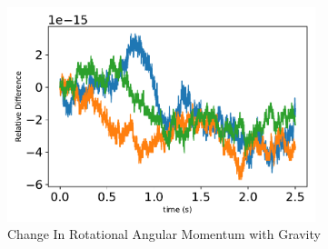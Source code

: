 \begin{figure}[htbp]\centerline{\includegraphics[width=0.8\textwidth]{AutoTeX/ChangeInRotationalAngularMomentumGravity}}\caption{Change In Rotational Angular Momentum with Gravity}\label{fig:ChangeInRotationalAngularMomentumGravity}\end{figure}